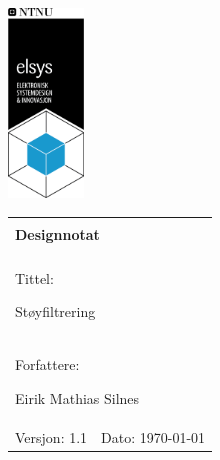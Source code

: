 \begin{minipage}[c]{0.15\textwidth}
\includegraphics[width=2.0cm]{Bilder/elsys_pos_staaende_ntnu.png}  
\end{minipage}
\begin{minipage}[c]{0.85\textwidth}

\renewcommand{\arraystretch}{1.7}
\large 
\begin{tabularx}{\textwidth}{|X|X|}
\hline
\multicolumn{2}{|l|}{} \\
\multicolumn{2}{|l|}{\huge \textbf{Designnotat}} \\
\multicolumn{2}{|l|}{}  \\
\hline
\multicolumn{2}{|l|}{Tittel: 

Støyfiltrering 
} \\
\hline
\multicolumn{2}{|l|}{Forfattere: 

Eirik Mathias Silnes
} \\
\hline

Versjon: 1.1 & Dato: \today
\\
\hline 
\end{tabularx}
\end{minipage}
\normalsize